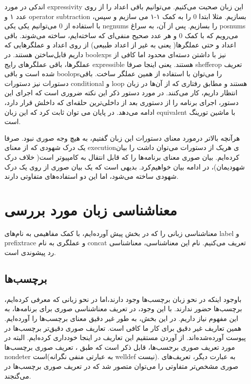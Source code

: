 اندکی در مورد \gls*{expressivity} این زبان صحبت می‌کنیم. می‌توانیم باقی اعداد را از روی عدد ۱ و \gls*{operator} \gls*{subtraction} بسازیم. مثلا ابتدا 0 را به کمک ۱-۱ می سازیم و سپس، با استفاده از 0 می‌توانیم یکی یکی \glspl*{negnum} را بسازیم. پس از آن، به سراغ \glspl*{posnum} می‌رویم که با کمک 0 و هر عدد صحیح منفی‌ای که ساخته‌ایم، ساخته می‌شوند. باقی اعداد و حتی عملگر‌ها( یعنی به غیر از اعداد طبیعی) از روی اعداد و عملگرهایی که داریم قابل‌ساختن هستند. در \glspl{boolexp} نیز با داشتن دسته‌‌ای محدود اما کافی از عملگر‌ها، باقی عملگر‌های رایج \gls*{expressible} هستند. یعنی اینجا صرفا \gls{shefferop} تعریف شده است و باقی \glspl{boolop}را می‌توان با استفاده از همین عملگر ساخت. باقی دستورات نیز دستورات \gls*{conditional} و \gls*{loop} هستند و مطابق رفتاری که از آن‌ها در زبان  انتظار داریم، کار می‌کنند. در مورد دستور  ذکر این نکته ضروری است که اجرای این دستور، اجرای برنامه را از دستوری بعد از داخلی‌ترین حلقه‌ای که  داخلش قرار دارد، ادامه می‌‌دهد. در پایان می توان ثابت کرد که این زبان \gls*{equivalent} با ماشین تورینگ\cite{davis} است. 

هر‌آنچه بالاتر در‌مورد معنای دستورات این زبان گفتیم، به هیچ وجه صوری نبود. صرفا یک درک شهودی‌ که از معنای \gls*{execution}ی هر‌یک از دستورات می‌توان داشت را بیان کرده‌ایم. بیان صوری معنای برنامه‌ها را که قابل انتقال به کامپیوتر‌ است( خلاف درک شهودیمان)، در ادامه بیان خواهیم‌کرد. بدیهی است که یک بیان صوری از روی یک درک شهودی ساخته می‌شود، اما این دو استفاده‌های متفاوتی دارند.

\section{معناشناسی زبان مورد بررسی‬}
معناشناسی زبانی را که در بخش پیش آورده‌ایم، با کمک مفاهیمی به نام‌های \gls{label} و \gls{prefixtrace} و عملگری به نام \gls{concat} تعریف می‌کنیم. نام این معناشناسی، معناشناسی رد پیشوندی است.\\

\subsection{برچسب‌ها}

با‌وجود اینکه در نحو زبان  برچسب‌ها وجود دارند،اما در نحو زبانی که معرفی کرده‌ایم، برچسب‌ها حضور ندارند. با این وجود، در تعریف معناشناسی صوری برای برنامه‌ها، به این مفهوم نیاز داریم. در این بخش، به ‌طور غیر دقیق معنای برچسب‌ها را آورده‌ایم. همین تعاریف غیر دقیق برای کار ما کافی است. تعاریف صوری دقیق‌تر برچسب‌ها در پیوست \cite{calcul} آورده‌شده‌اند. از آوردن مستقیم این تعاریف در اینجا خود‌داری کرده‌ایم. البته در مورد تعریف صوری برجسب‌ها، قابل ذکر است که طبق \cite{cousotbook}، تعریف صوری برچسب‌ها \gls*{nondeter} است(به عبارتی منفی نگرانه \gls*{welldef} نیست). به عبارت دیگر، تعریف‌های صوری مشخص‌تر متفاوتی را می‌توان متصور شد که در تعریف صوری برچسب‌ها در \cite{cousotbook} می‌گنجند.

